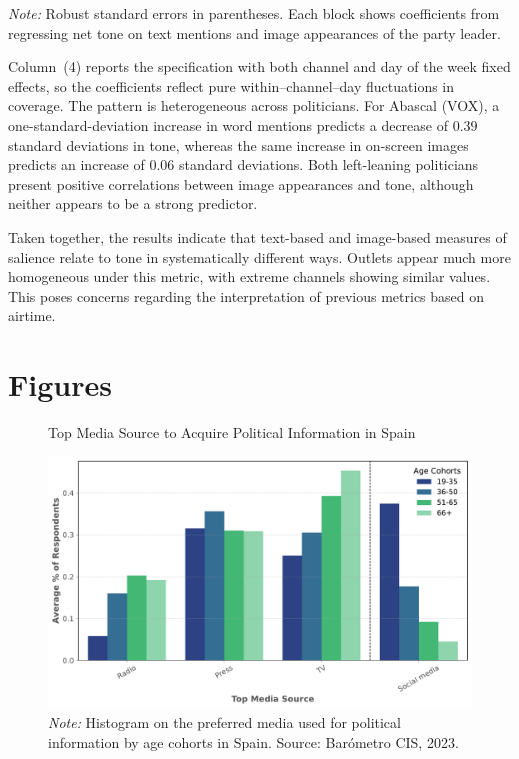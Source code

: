 \documentclass[12pt]{article}
\begin{document}
\begin{table}[htbp!]
	\vspace{0.5em}
	\begin{flushleft}
		\small \textit{Note:} Robust standard errors in parentheses.
		Each block shows coefficients from regressing net tone on text mentions and image appearances of the party leader.
	\end{flushleft}
\end{table}



Column~(4) reports the specification with both channel and day of the week fixed effects, so the coefficients reflect pure within–channel–day fluctuations in coverage. The pattern is heterogeneous across politicians. For Abascal (VOX), a one-standard-deviation increase in word mentions predicts a decrease of $0.39$ standard deviations in tone, whereas the same increase in on-screen images predicts an increase of $0.06$ standard deviations. Both left-leaning politicians present positive correlations between image appearances and tone, although neither appears to be a strong predictor.

Taken together, the results indicate that text-based and image-based measures of salience relate to tone in systematically different ways. Outlets appear much more homogeneous under this metric, with extreme channels showing similar values. This poses concerns regarding the interpretation of previous metrics based on airtime.






\section{Figures}



\begin{figure}[!htbp]
	\centering
	\caption{Top Media Source to Acquire Political Information in Spain}
	\includegraphics[width=130mm]{figures/age_cohorts}
	\caption*{\small \textit{Note:} Histogram on the preferred media used for political information by age cohorts in Spain.  
		Source: Barómetro CIS, 2023. }
	\label{fig:motivation}
\end{figure}
\end{document}
